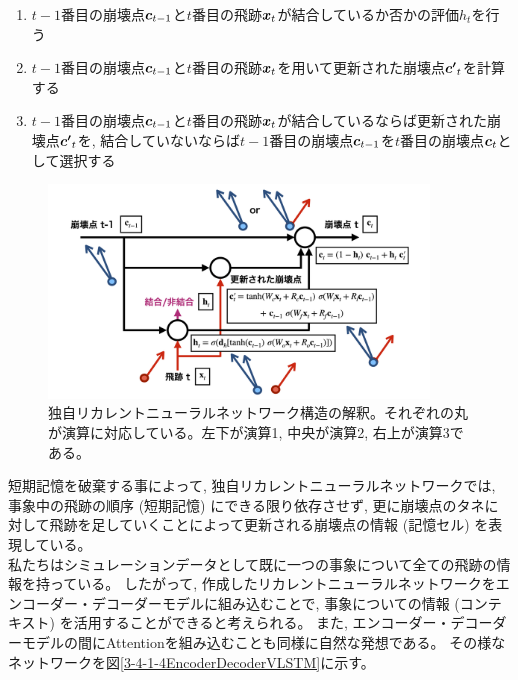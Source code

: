 \begin{enumerate}
 \item $t-1$番目の崩壊点${\mbox{\boldmath{$c$}}}_{t-1}$と$t$番目の飛跡${\mbox{\boldmath{$x$}}}_{t}$が結合しているか否かの評価$h_{t}$を行う
 \item $t-1$番目の崩壊点${\mbox{\boldmath{$c$}}}_{t-1}$と$t$番目の飛跡${\mbox{\boldmath{$x$}}}_{t}$を用いて更新された崩壊点${\mbox{\boldmath{$c'$}}}_{t}$を計算する
 \item $t-1$番目の崩壊点${\mbox{\boldmath{$c$}}}_{t-1}$と$t$番目の飛跡${\mbox{\boldmath{$x$}}}_{t}$が結合しているならば更新された崩壊点${\mbox{\boldmath{$c'$}}}_{t}$を, 結合していないならば$t-1$番目の崩壊点${\mbox{\boldmath{$c$}}}_{t-1}$を$t$番目の崩壊点${\mbox{\boldmath{$c$}}}_{t}$として選択する
\end{enumerate}

\begin{figure}[htbp]
 \centering
 \includegraphics[width=0.9\textwidth, clip]{Figure/3Networks/3-4-1-3Interpretation.png}
 \caption[独自リカレントニューラルネットワーク構造の解釈]{独自リカレントニューラルネットワーク構造の解釈。それぞれの丸が演算に対応している。左下が演算1, 中央が演算2, 右上が演算3である。}
 \label{3-4-1-3Interpretation}
\end{figure}

短期記憶を破棄する事によって, 独自リカレントニューラルネットワークでは, 事象中の飛跡の順序 (短期記憶) にできる限り依存させず, 更に崩壊点のタネに対して飛跡を足していくことによって更新される崩壊点の情報 (記憶セル) を表現している。\\

私たちはシミュレーションデータとして既に一つの事象について全ての飛跡の情報を持っている。
したがって, 作成したリカレントニューラルネットワークをエンコーダー・デコーダーモデルに組み込むことで, 事象についての情報 (コンテキスト) を活用することができると考えられる。
また, エンコーダー・デコーダーモデルの間にAttentionを組み込むことも同様に自然な発想である。
その様なネットワークを図\ref{3-4-1-4EncoderDecoderVLSTM}に示す。\\

